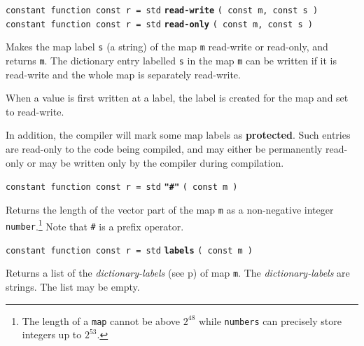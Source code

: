 \documentclass[12pt]{article}
\newcommand{\key}[1]{{\rm \bfseries #1}}
\newcommand{\ttkey}[1]{{\tt \bfseries #1}}
\newcommand{\pagref}[1]{p\pageref{#1}}
\newenvironment{indpar}[1][0.3in]%
	{\begin{list}{}%
		     {\setlength{\itemsep}{0in}%
		      \setlength{\topsep}{0in}%
		      \setlength{\parsep}{1ex}%
		      \setlength{\labelwidth}{#1}%
		      \setlength{\leftmargin}{#1}%
		      \addtolength{\leftmargin}{\labelsep}}%
	 \item}%
	{\end{list}}
\begin{document}
{\tt constant function const r = std} \ttkey{read-write}
                                      {\tt ( const m, const s )} \\
{\tt constant function const r = std} \ttkey{read-only}
                                      {\tt ( const m, const s )} %
\label{READ-ONLY-DICTIONARY-FUNCTION}
\begin{indpar}
Makes the map label {\tt s} (a string) of the map {\tt m}
read-write or read-only, and returns {\tt m}.  The dictionary entry
labelled {\tt s} in the map {\tt m} can be written if it is
read-write and the whole map is separately read-write.

When a value is first written at a label, the label is created
for the map and set to read-write.

In addition, the compiler will mark some map labels as \key{protected}.
Such entries are read-only to the code being compiled, and may either be
permanently read-only or may be written only by the compiler
during compilation.
\end{indpar}

{\tt constant function const r = std} \ttkey{"\#"} {\tt ( const m )}
\begin{indpar}
Returns the length of the vector part of the map {\tt m}
as a non-negative integer
{\tt number}.\footnote{The length of a {\tt map} cannot
be above $2^{48}$ while
{\tt numbers} can precisely store integers up to $2^{53}$.}
Note that {\tt \#} is a prefix operator.
\end{indpar}

{\tt constant function const r = std} \ttkey{labels} {\tt ( const m )}
\begin{indpar}
Returns a list of the {\em dictionary-labels}
(see \pagref{DICTIONARY-LABEL}) of map {\tt m}.
The {\em dictionary-labels} are strings.  The list may be empty.
\end{indpar}
\end{document}
